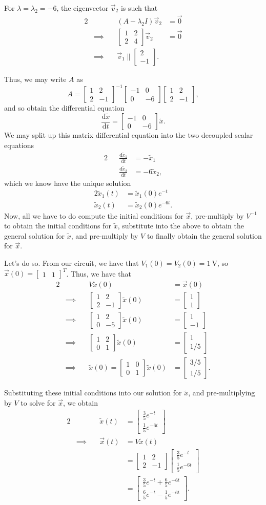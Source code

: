 \documentclass[letterpaper]{article}
\theoremstyle{remark}
\renewcommand{\tilde}[1]{\widetilde{#1}}
\newcommand{\dt}{\mathrm{d}t}
\newcommand{\diff}{\mathrm{d}}
\newcommand{\mat}[1]{\ensuremath{\begin{bmatrix}#1\end{bmatrix}}}
\newcommand{\eqn}[1]{\begin{alignat*}{2}#1\end{alignat*}}
\newcommand*{\thus}{&\implies\quad&}
\begin{document}
For $\lambda = \lambda_2 = -6$, the eigenvector $\vec{v}_2$ is such that
\eqn{
    && (A - \lambda_2 I)\vec{v}_2 &= \vec{0} \\
    \thus \mat{1 & 2 \\ 2 & 4}\vec{v}_2 &= \vec{0} \\
    \thus \vec{v}_1 \parallel \mat{2 \\ -1}.
}

Thus, we may write $A$ as
\[
    A = \mat{1 & 2 \\ 2 & -1}^{-1} \mat{-1 & 0 \\ 0 & -6} \mat{1 & 2 \\ 2 & -1},
\]
and so obtain the differential equation
\[
    \frac{\diff\tilde{x}}{\dt} = \mat{-1 & 0 \\ 0 & -6} \tilde{x}.
\]
We may split up this matrix differential equation into the two decoupled scalar equations
\eqn{
    && \frac{\diff \tilde{x}_1}{\dt} &= -\tilde{x}_1 \\
    && \frac{\diff \tilde{x}_2}{\dt} &= -6\tilde{x}_2,
}
which we know have the unique solution
\eqn{
    \tilde{x}_1(t) &= \tilde{x}_1(0)e^{-t} \\
    \tilde{x}_2(t) &= \tilde{x}_2(0)e^{-6t}.
}
Now, all we have to do compute the initial conditions for $\vec{x}$, pre-multiply by $V^{-1}$ to obtain the initial conditions for $\tilde{x}$, substitute into the above to obtain the general solution for $\tilde{x}$, and pre-multiply by $V$ to finally obtain the general solution for $\vec{x}$.

Let's do so. From our circuit, we have that $V_1(0) = V_2(0) = \SI{1}{\volt}$, so $\vec{x}(0) = \mat{1 & 1}^T$. Thus, we have that
\eqn{
    && V\tilde{x}(0) &= \vec{x}(0) \\
    \thus \mat{1 & 2 \\ 2 & -1}\tilde{x}(0) &= \mat{1 \\ 1} \\
    \thus \mat{1 & 2 \\ 0 & -5} \tilde{x}(0) &= \mat{1 \\ -1} \\
    \thus \mat{1 & 2 \\ 0 & 1} \tilde{x}(0) &= \mat{1 \\ 1/5} \\
    \thus \tilde{x}(0) = \mat{1 & 0 \\ 0 & 1} \tilde{x}(0) &= \mat{3/5 \\ 1/5}.
}

Substituting these initial conditions into our solution for $\tilde{x}$, and pre-multiplying by $V$ to solve for $\vec{x}$, we obtain
\eqn{
    && \tilde{x}(t) &= \mat{\frac{3}{5}e^{-t} \\ \frac{1}{5}e^{-6t}} \\
    \thus \vec{x}(t) &= V\tilde{x}(t) \\
    &&&= \mat{1 & 2 \\ 2 & -1}\mat{\frac{3}{5}e^{-t} \\ \frac{1}{5}e^{-6t}} \\
    &&&= \mat{\frac{3}{5} e^{-t} + \frac{6}{5} e^{-6t} \\ \frac{6}{5}e^{-t} - \frac{1}{5}e^{-6t}}.
}
\end{document}
